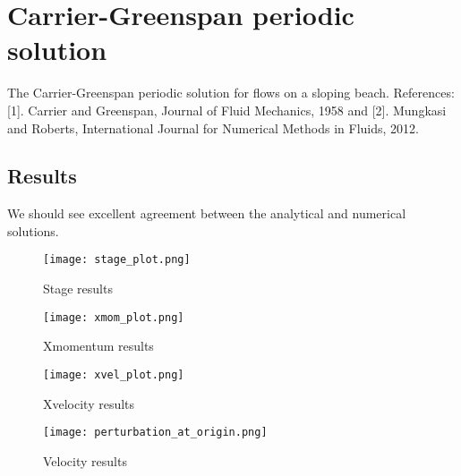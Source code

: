 
\section{Carrier-Greenspan periodic solution}

The Carrier-Greenspan periodic solution for flows on a sloping beach. References: [1]. Carrier and Greenspan, Journal of Fluid Mechanics, 1958 and [2]. Mungkasi and Roberts, International Journal for Numerical Methods in Fluids, 2012.

\subsection{Results}


We should see excellent agreement between the analytical and numerical solutions.

\begin{figure}[h]
\begin{center}
\texttt{[image: stage\_plot.png]}
\end{center}
\caption{Stage results}
\end{figure}

\begin{figure}[h]
\begin{center}
\texttt{[image: xmom\_plot.png]}
\end{center}
\caption{Xmomentum results}
\end{figure}

\begin{figure}[h]
\begin{center}
\texttt{[image: xvel\_plot.png]}
\end{center}
\caption{Xvelocity results}
\end{figure}


\begin{figure}[h]
\begin{center}
\texttt{[image: perturbation\_at\_origin.png]}
\end{center}
\caption{Velocity results}
\end{figure}


\endinput

